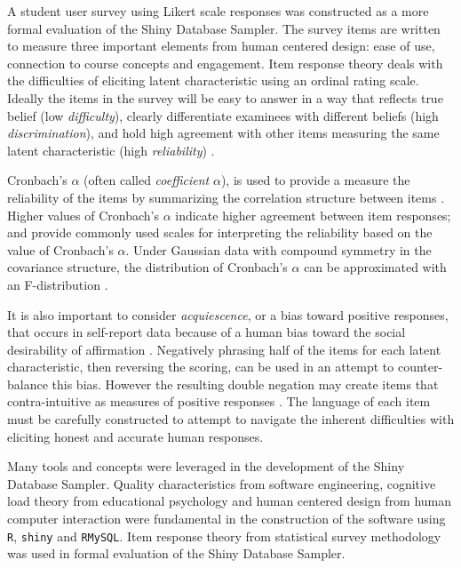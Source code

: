 \documentclass[11pt]{isuthesis}
\begin{document}
A student user survey using Likert scale responses was constructed as a more formal evaluation of the Shiny Database Sampler. The survey items are written to measure three important elements from human centered design: ease of use, connection to course concepts and engagement. Item response theory deals with the difficulties of eliciting latent characteristic using an ordinal rating scale. Ideally the items in the survey will be easy to answer in a way that reflects true belief (low \textit{difficulty}), clearly differentiate examinees with different beliefs (high \textit{discrimination}), and hold high agreement with other items measuring the same latent characteristic (high \textit{reliability}) \citep{demars2010item}.

Cronbach's $\alpha$ (often called \textit{coefficient} $\alpha$), is used to provide a measure the reliability of the items by summarizing the correlation structure between items \citep{cronbach:51}. Higher values of Cronbach's $\alpha$ indicate higher agreement between item responses; \citet{GeorgeMallery2003} and \citet{Nunnally1978} provide commonly used scales for interpreting the reliability based on the value of Cronbach's $\alpha$.  Under Gaussian data with compound symmetry in the covariance structure, the distribution of Cronbach's $\alpha$ can be approximated with an F-distribution \citep{KistnerMuller2004}. 

It is also important to consider \textit{acquiescence}, or a bias toward positive responses, that occurs in self-report data because of a human bias toward the social desirability of affirmation \citep{Furnham1986}. Negatively phrasing half of the items for each latent characteristic, then reversing the scoring, can be used in an attempt to counter-balance this bias. However the resulting double negation may create items that contra-intuitive as measures of positive responses \citep{Friborg2006}. The language of each item must be carefully constructed to attempt to navigate the inherent difficulties with eliciting honest and accurate human responses.

Many tools and concepts were leveraged in the development of the Shiny Database Sampler. Quality characteristics from software engineering, cognitive load theory from educational psychology and human centered design from human computer interaction were fundamental in the construction of the software using \texttt{R}, \texttt{shiny} and \texttt{RMySQL}. Item response theory from statistical survey methodology was used in formal evaluation of the Shiny Database Sampler. 
\end{document}

